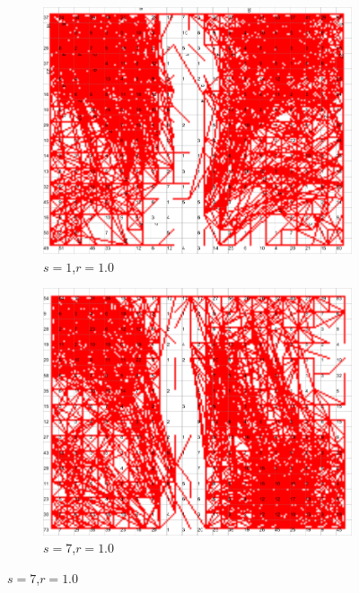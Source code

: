 \documentclass{acm_proc_article-sp}
\begin{document}
\begin{figure}
\centering
    \centering
    \begin{subfigure}[b]{0.30\linewidth}
        \includegraphics[width=\linewidth]{img/wine-newmid-radius-neighbourhood-graph--r-10-seed-1}
        \caption{$s=1$,$r=1.0$}
        \label{fig:wine-newmid-radius-neighbourhood-graph--r-10-seed-1}
    \end{subfigure}
    \begin{subfigure}[b]{0.30\linewidth}
        \includegraphics[width=\linewidth]{img/wine-newmid-radius-neighbourhood-graph--r-10-seed-7}
        \caption{$s=7$,$r=1.0$}

\end{subfigure}
\end{figure}
\end{document}
